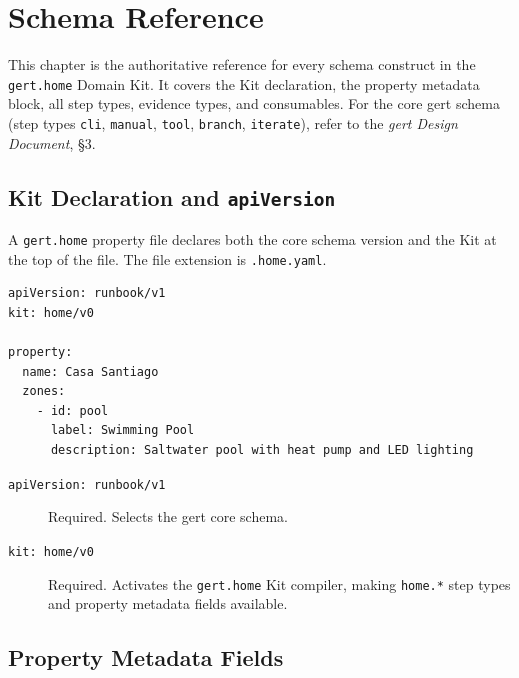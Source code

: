 \chapter{Schema Reference}
\label{ch:schema-reference}

This chapter is the authoritative reference for every schema construct in the
\texttt{gert.home} Domain Kit. It covers the Kit declaration, the property metadata block,
all step types, evidence types, and consumables. For the core gert schema (step types
\texttt{cli}, \texttt{manual}, \texttt{tool}, \texttt{branch}, \texttt{iterate}), refer to
the \emph{gert Design Document}, §3.

\section{Kit Declaration and \texttt{apiVersion}}
\label{sec:schema-apiversion}

A \texttt{gert.home} property file declares both the core schema version and the Kit at the
top of the file. The file extension is \texttt{.home.yaml}.

\begin{verbatim}
apiVersion: runbook/v1
kit: home/v0

property:
  name: Casa Santiago
  zones:
    - id: pool
      label: Swimming Pool
      description: Saltwater pool with heat pump and LED lighting
\end{verbatim}

\begin{description}
  \item[\texttt{apiVersion: runbook/v1}] Required. Selects the gert core schema.
  \item[\texttt{kit: home/v0}] Required. Activates the \texttt{gert.home} Kit compiler,
        making \texttt{home.*} step types and property metadata fields available.
\end{description}

\section{Property Metadata Fields}
\label{sec:schema-metadata}


